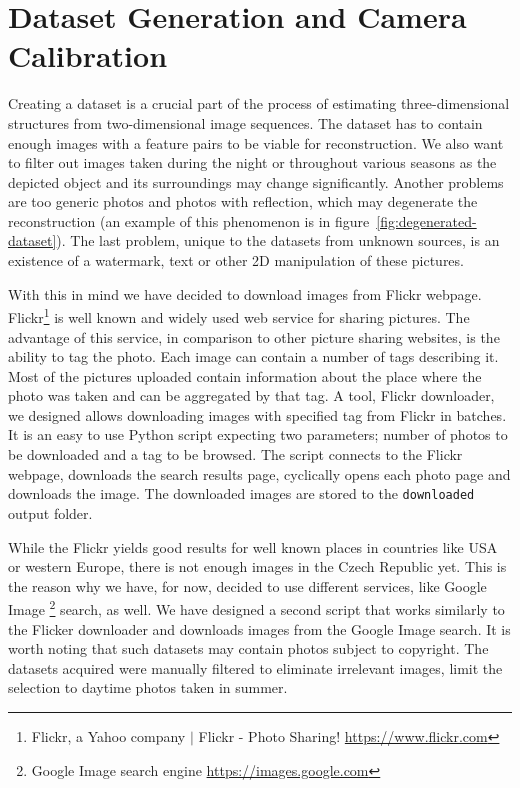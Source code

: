 \section{Dataset Generation and Camera Calibration}
\label{sec:camera_calib}
Creating a dataset is a crucial part of the process of estimating three-dimensional structures from two-dimensional image sequences. The dataset has to contain enough images with a feature pairs to be viable for reconstruction. We also want to filter out images taken during the night or throughout various seasons as the depicted object and its surroundings may change significantly. Another problems are too generic photos and photos with reflection, which may degenerate the reconstruction (an example of this phenomenon is in figure~\ref{fig:degenerated-dataset}). The last problem, unique to the datasets from unknown sources, is an existence of a watermark, text or other 2D manipulation of these pictures.

With this in mind we have decided to download images from Flickr webpage. Flickr\footnote{Flickr, a Yahoo company $|$ Flickr - Photo Sharing! \url{https://www.flickr.com}} is well known and widely used web service for sharing pictures. The advantage of this service, in comparison to other picture sharing websites, is the ability to tag the photo. Each image can contain a number of tags describing it. Most of the pictures uploaded contain information about the place where the photo was taken and can be aggregated by that tag. A tool, Flickr downloader, we designed allows downloading images with specified tag from Flickr in batches. It is an easy to use Python script expecting two parameters; number of photos to be downloaded and a tag to be browsed. The script connects to the Flickr webpage, downloads the search results page, cyclically opens each photo page and downloads the image. The downloaded images are stored to the \texttt{downloaded} output folder.

While the Flickr yields good results for well known places in countries like USA or western Europe, there is not enough images in the Czech Republic yet. This is the reason why we have, for now, decided to use different services, like Google Image \footnote{Google Image search engine \url{https://images.google.com}} search, as well. We have designed a second script that works similarly to the Flicker downloader and downloads images from the Google Image search. It is worth noting that such datasets may contain photos subject to copyright. The datasets acquired were manually filtered to eliminate irrelevant images, limit the selection to daytime photos taken in summer.

